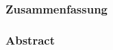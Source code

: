 
\subsubsection*{Zusammenfassung}
\label{sec:Zusammenfassung}


\subsubsection*{Abstract}
\label{sec:abstract}

